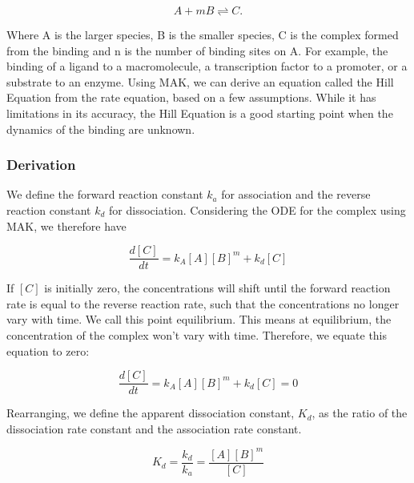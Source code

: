 \documentclass[11pt, letterpaper, english]{article}
\begin{document}
\begin{equation}
    A+mB \rightleftharpoons C.
\end{equation}
   
\par{Where A is the larger species, B is the smaller species, C is the complex formed from the binding and n is the number of binding sites on A. For example, the binding of a ligand to a macromolecule, a transcription factor to a promoter, or a substrate to an enzyme. Using MAK, we can derive an equation called the Hill Equation from the rate equation, based on a few assumptions. While it has limitations in its accuracy, the Hill Equation is a good starting point when the dynamics of the binding are unknown.}
    
    \subsubsection{Derivation}
    
    \par{We define the forward reaction constant $k_a$ for association and the reverse reaction constant $k_d$ for dissociation. Considering the ODE for the complex using MAK, we therefore have}
    
    \begin{equation}
        \frac{d [C]}{d t}=k_A{[A]}[B]^m+k_d[C]
    \end{equation}
    
    \par{If $[C]$ is initially zero, the concentrations will shift until the forward reaction rate is equal to the reverse reaction rate, such that the concentrations no longer vary with time. We call this point equilibrium. This means at equilibrium, the concentration of the complex won’t vary with time. Therefore, we equate this equation to zero:}
    
    \begin{equation}
        \frac{d [C]}{d t}=k_A{[A]}[B]^m+k_d[C]=0
    \end{equation}
    
    \par{Rearranging, we define the apparent dissociation constant, $K_d$, as the ratio of the dissociation rate constant and the association rate constant.}
    
    \begin{equation}
        K_d = \frac{k_d}{k_a}=\frac{[A]{[B]}^m}{[C]}
        \label{eq31}
    \end{equation}
    
\end{document}
